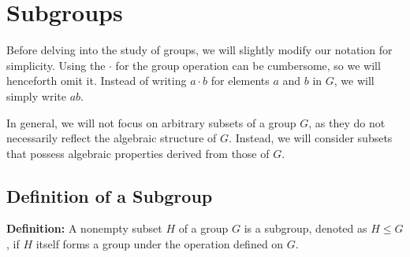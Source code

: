 \chapter{Subgroups}
Before delving into the study of groups, we will slightly modify our notation for simplicity. Using the $\cdot$ for the group operation can be cumbersome, so we will henceforth omit it. Instead of writing \(a \cdot b\) for elements \(a\) and \(b\) in \(G\), we will simply write \(ab\).

In general, we will not focus on arbitrary subsets of a group \(G\), as they do not necessarily reflect the algebraic structure of \(G\). Instead, we will consider subsets that possess algebraic properties derived from those of \(G\). 

\section{Definition of a Subgroup}
\textbf{Definition:}
A nonempty subset \(H\) of a group \(G\) is a subgroup, denoted as \(H \leq G\), if \(H\) itself forms a group under the operation defined on \(G\).

